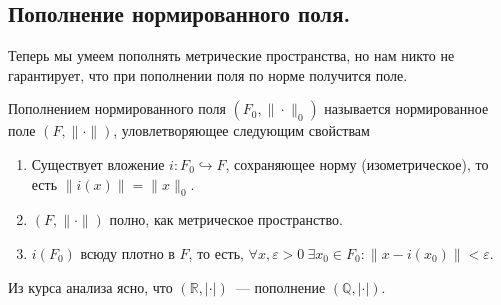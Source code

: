 \documentclass[11pt]{report}
\begin{document}
    \subsection{Пополнение нормированного поля.}
    Теперь мы умеем пополнять метрические пространства, но нам никто не гарантирует, что при пополнении поля по норме получится поле.
    \begin{definition}
        Пополнением нормированного поля $(F_0, \| \cdot \|_0 )$ называется нормированное поле $(F, \| \cdot \|)$,
        уловлетворяющее следующим свойствам
        \begin{enumerate}
            \item Существует вложение $i\colon F_0 \hookrightarrow F$, сохраняющее норму (изометрическое), то есть $\| i(x) \| = \| x \|_0$.

            \item $(F, \| \cdot \|)$ полно, как метрическое пространство.

            \item $i(F_0)$ всюду плотно в $F$, то есть, $\forall x,  \varepsilon > 0 \ \exists x_0 \in F_0\colon \| x - i(x_0)\| < \varepsilon$.
        \end{enumerate}
    \end{definition}

    \begin{example}
        Из курса анализа ясно, что $(\mathbb{R}, |\cdot|)$~--- пополнение $(\mathbb{Q}, |\cdot|)$.
    \end{example}
\end{document}
